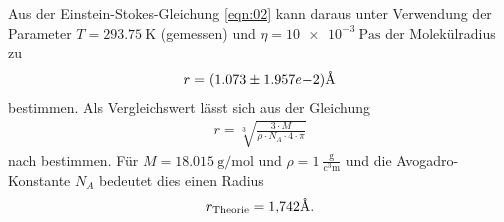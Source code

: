 \noindent Aus der Einstein-Stokes-Gleichung \ref{eqn:02} kann daraus unter Verwendung der
Parameter $T = \SI{293.75}{\kelvin}$ (gemessen) und $\eta = \SI{10e-3}{\pascal\second}$
\cite{Viskosität_Wasser} der Molekülradius zu
\begin{align*}
 r = (1.073\pm 1.957e{-2}) \text{\r{A}}
\end{align*}
\noindent bestimmen. Als Vergleichswert lässt sich aus der Gleichung
\begin{align}
  r = \sqrt[3]{\frac{3 \cdot M}{\rho \cdot N_A \cdot 4 \cdot \pi}}
  \label{eqn:07}
\end{align}
\noindent nach \cite{radius} bestimmen. Für $M = \SI{18.015}{\gram\per\mol}$
und $\rho = 1 \: \frac{\si{\gram}}{\si{\cubic\centi\meter}}$
\cite{Viskosität_Wasser} und die Avogadro-Konstante $N_A$ bedeutet dies einen
Radius
\begin{align*}
  r_\text{Theorie} = \num{1.742} \text{\r{A}}.
\end{align*}
